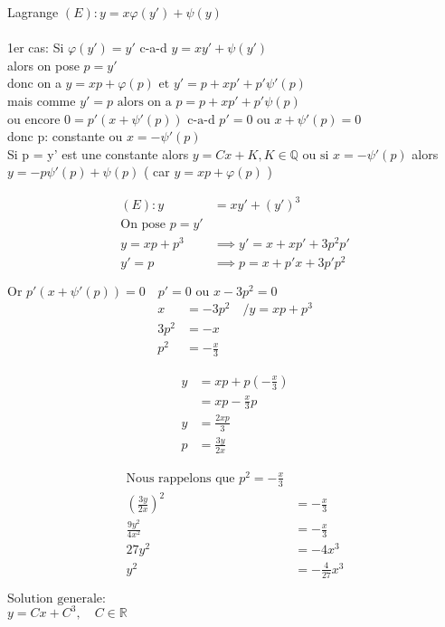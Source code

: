 Lagrange $(E): y = x \varphi(y') +\psi(y)$ \\ \\
1er cas: Si  $\varphi(y') = y'$ c-a-d $y = xy'+ \psi(y')$ \\
alors on pose $ p = y'$ \\
donc on a $ y = xp + \varphi(p) \text{ et } y' = p + xp' + p'\psi'(p)$ \\
mais comme $ y' = p \text{ alors on a }  p = p + xp' + p'\psi(p)$ \\
ou encore $ 0 = p'(x + \psi'(p)) \text{ c-a-d } p' = 0 \text{ ou } x + \psi'(p) = 0$ \\
donc p: constante ou $ x = - \psi'(p)$ \\
Si p = y' est une constante alors $ y = Cx + K, K \in \mathbb{Q} \text{ ou si } x = -\psi'(p)$
alors $ y = -p\psi'(p) + \psi(p)$ ( car $y = xp + \varphi(p)$ )

\begin{align*}
	(E): y &= xy' + (y')^{3} \\
	\text{On pose } p = y' \\
	y = xp + p^3 &\implies y' = x + xp' + 3p^2p' \\
	y' = p &\implies p = x + p'x + 3p'p^2
\end{align*}

$\text{Or } p'(x + \psi'(p)) = 0 \quad p' = 0 \text{ ou } x-3p^2 = 0$ \\
\begin{align*}
	x &= -3p^2 \quad /y = xp + p^3 \\
	3p^2 &= -x \\
	p^2 &= -\frac{x}{3}
\end{align*}

\begin{align*}
	y &= xp + p(-\frac{x}{3}) \\
	  &= xp - \frac{x}{3}p \\
	y &= \frac{2xp}{3} \\
	p &= \frac{3y}{2x}
\end{align*}

\begin{align*}
	\text{Nous rappelons que } p^2 = -\frac{x}{3} \\
	(\frac{3y}{2x})^2 &= -\frac{x}{3} \\
	\frac{9y^2}{4x^2} &= -\frac{x}{3} \\
	27y^2 &= -4x^3 \\
	y^2 &= -\frac{4}{27}x^3
\end{align*}

$\text{Solution generale: }$ \\
$y = Cx + C^3, \quad C \in \mathbb{R}$ \\ \\
